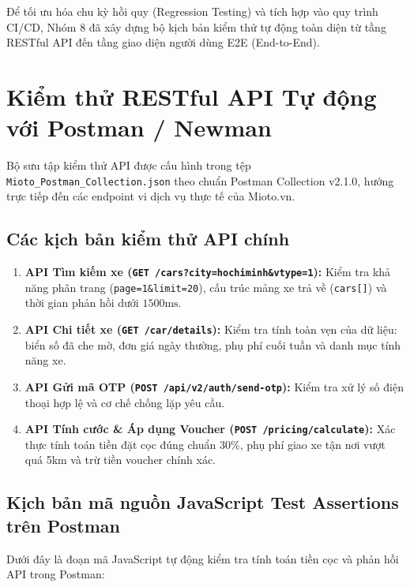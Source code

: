 \documentclass[12pt,a4paper,oneside]{report}
\begin{document}
Để tối ưu hóa chu kỳ hồi quy (Regression Testing) và tích hợp vào quy trình CI/CD, Nhóm 8 đã xây dựng bộ kịch bản kiểm thử tự động toàn diện từ tầng RESTful API đến tầng giao diện người dùng E2E (End-to-End).

\section{Kiểm thử RESTful API Tự động với Postman / Newman}
Bộ sưu tập kiểm thử API được cấu hình trong tệp \texttt{Mioto\_Postman\_Collection.json} theo chuẩn Postman Collection v2.1.0, hướng trực tiếp đến các endpoint vi dịch vụ thực tế của Mioto.vn.

\subsection{Các kịch bản kiểm thử API chính}
\begin{enumerate}
  \item \textbf{API Tìm kiếm xe (\texttt{GET /cars?city=hochiminh\&vtype=1}):} Kiểm tra khả năng phân trang (\texttt{page=1\&limit=20}), cấu trúc mảng xe trả về (\texttt{cars[]}) và thời gian phản hồi dưới $1500\text{ms}$.
  \item \textbf{API Chi tiết xe (\texttt{GET /car/details}):} Kiểm tra tính toàn vẹn của dữ liệu: biển số đã che mờ, đơn giá ngày thường, phụ phí cuối tuần và danh mục tính năng xe.
  \item \textbf{API Gửi mã OTP (\texttt{POST /api/v2/auth/send-otp}):} Kiểm tra xử lý số điện thoại hợp lệ và cơ chế chống lặp yêu cầu.
  \item \textbf{API Tính cước \& Áp dụng Voucher (\texttt{POST /pricing/calculate}):} Xác thực tính toán tiền đặt cọc đúng chuẩn 30\%, phụ phí giao xe tận nơi vượt quá 5km và trừ tiền voucher chính xác.
\end{enumerate}

\subsection{Kịch bản mã nguồn JavaScript Test Assertions trên Postman}
Dưới đây là đoạn mã JavaScript tự động kiểm tra tính toán tiền cọc và phản hồi API trong Postman:
\end{document}

